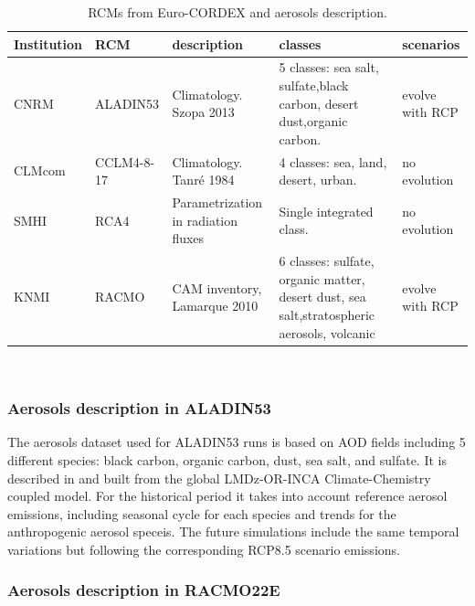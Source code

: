 
\begin{table}[h!]
\caption[RCMs from Euro-CORDEX and aerosols description]{\label{tb:aero}RCMs from Euro-CORDEX and aerosols description.}
\footnotesize
\begin{tabular}{>{\raggedrigth}m{1.3cm}>{\raggedright}m{1.5cm}|>{\raggedright}m{2.2cm}>{\raggedright}m{2.2cm}>{\raggedright}m{2cm}}
\toprule 
Institution  & RCM & description & classes & scenarios \tabularnewline
\midrule
CNRM & ALADIN53 & Climatology. Szopa 2013 & 5 classes: sea salt, sulfate,black carbon, desert dust,organic carbon.& evolve with RCP \tabularnewline
CLMcom&CCLM4-8-17& Climatology. Tanré 1984 & 4 classes: sea, land, desert, urban.& no evolution\tabularnewline 
SMHI&RCA4& Parametrization in radiation fluxes & Single integrated class.& no evolution \tabularnewline
KNMI&RACMO&CAM inventory, Lamarque 2010 & 6 classes: sulfate, organic matter, desert dust, sea salt,stratospheric aerosols, volcanic & evolve with RCP\tabularnewline
\bottomrule
\end{tabular}\\
\end{table}
\normalsize

\subsubsection{Aerosols description in ALADIN53}

The aerosols dataset used for ALADIN53 runs is based on AOD fields including 5 different species: black carbon, organic carbon, dust, sea salt, and sulfate. It is described in \cite*{Szopa2013} and built from the global LMDz-OR-INCA Climate-Chemistry coupled model. For the historical period it takes into account reference aerosol emissions, including seasonal cycle for each species and trends for the anthropogenic aerosol speceis. The future simulations include the same temporal variations but following the corresponding RCP8.5 scenario emissions. 

\subsubsection{Aerosols description in RACMO22E}

